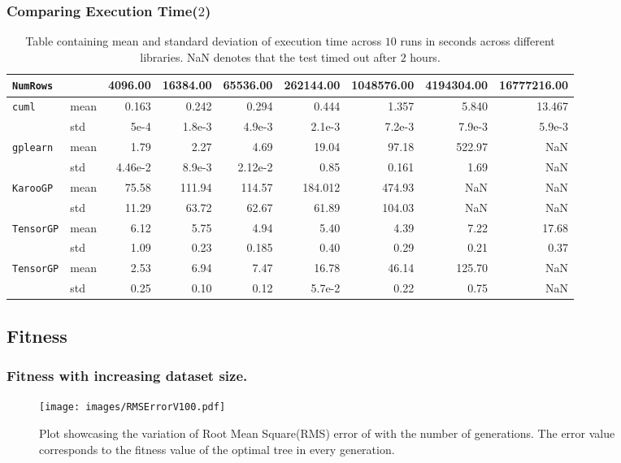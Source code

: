 \documentclass{beamer}
\begin{document}
\begin{frame}
  \frametitle{Comparing Execution Time($2$)}
  \begin{table}
    \tiny
    \begin{tabular}{llrrrrrrr}
      \toprule
      \texttt{NumRows} & {} &  4096.00 &  16384.00 &  65536.00 & 262144.00 & 1048576.00 & 4194304.00 & 16777216.00 \\
      \midrule
      \texttt{cuml} & mean &   0.163 &    0.242 &    0.294 &    0.444 &    1.357 &    5.840 &    13.467 \\
                  & std &     5e-4 &      1.8e-3 &      4.9e-3 &      2.1e-3 &       7.2e-3 &       7.9e-3 &        5.9e-3 \\
      \texttt{gplearn} & mean &  1.79 &   2.27 &   4.69 &  19.04 &   97.18 &  522.97 &         NaN \\
                  & std &    4.46e-2 &      8.9e-3 &     2.12e-2 &     0.85 &     0.161 &    1.69 &         NaN \\
      \texttt{KarooGP} & mean & 75.58 & 111.94 & 114.57 & 184.012 &  474.93 &        NaN &         NaN \\
                  & std & 11.29 &  63.72 &  62.67 &  61.89 &  104.03 &        NaN &         NaN \\
      \texttt{TensorGP}\footnotemark & mean &  6.12 &   5.75 &   4.94 &   5.40 &    4.39 &    7.22 &    17.68 \\
                  & std &  1.09 &    0.23 &    0.185 &    0.40 &     0.29 &     0.21 &      0.37 \\
      \texttt{TensorGP}\footnotemark & mean &  2.53 &   6.94 &   7.47 &  16.78 &   46.14 &  125.70 &         NaN \\
                  & std &   0.25 &    0.10 &    0.12 &     5.7e-2 &     0.22 &     0.75 &         NaN \\
      \bottomrule
      \end{tabular}      
    \caption{Table containing mean and standard deviation of execution time across $10$ runs in seconds across different libraries. NaN denotes that the test timed out after $2$ hours.}
    \label{tab:execavgs}
  \end{table}
\end{frame}


\subsection{Fitness}
\begin{frame}
  \frametitle{Fitness with increasing dataset size.}
  \begin{figure}[htbp]
    \centering
    \texttt{[image: images/RMSErrorV100.pdf]}
    \caption{Plot showcasing the variation of Root Mean Square(RMS) error of with the number of generations. The error value corresponds to the fitness value of the optimal tree in every generation. }
    \label{fig:besttrainfit}
  \end{figure}
\end{frame}
\end{document}
